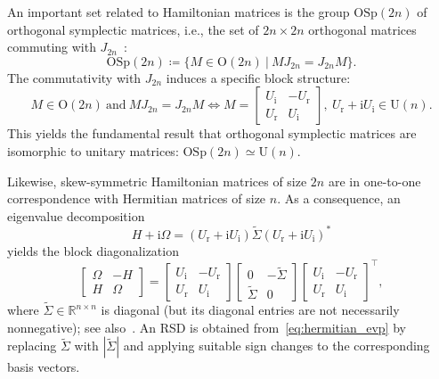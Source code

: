 \documentclass[final,onefignum,onetabnum,dvipsnames]{siamart251216}
\numberwithin{algorithm}{section}
\numberwithin{equation}{section}
\begin{document}
An important set related to Hamiltonian matrices is the group $\mathrm{OSp}(2n)$ of orthogonal symplectic matrices, i.e., the set of $2n\times 2n$ orthogonal matrices commuting with $J_{2n}$~\cite{Dopico09,Fassbender01}:
\begin{equation*}
    \mathrm{OSp}(2n)\coloneq \{M\in \mathrm{O}(2n)\ | \ MJ_{2n} = J_{2n} M\}.
\end{equation*}
The commutativity with $J_{2n}$ induces a specific block structure:
\begin{equation}\label{eq:symplectic_blocks}
    M\in\mathrm{O}(2n)\ \text{and} \ MJ_{2n} = J_{2n} M \iff M = \begin{bmatrix}
            U_\mathrm{i}&-U_\mathrm{r}\\
            U_\mathrm{r}&U_\mathrm{i}
        \end{bmatrix}, \ U_\mathrm{r} + \mathrm{i} U_\mathrm{i} \in \mathrm{U}(n).
\end{equation}
This yields the fundamental result that orthogonal symplectic matrices are isomorphic to unitary matrices: $ \mathrm{OSp}(2n)\simeq \mathrm{U}(n)$.

Likewise, skew-symmetric Hamiltonian matrices of size $2n$ are in one-to-one correspondence with Hermitian matrices of size $n$. As a consequence, an eigenvalue decomposition
\[
 H+\mathrm{i} \Omega = (U_\mathrm{r} + \mathrm{i} U_\mathrm{i})\widetilde{\Sigma} (U_\mathrm{r} + \mathrm{i} U_\mathrm{i})^*
\]
yields the block diagonalization
\begin{equation}\label{eq:hermitian_evp}
        \begin{bmatrix}
            \Omega&-H\\
            H&\Omega
        \end{bmatrix}=\begin{bmatrix}
            U_\mathrm{i}&-U_\mathrm{r}\\
            U_\mathrm{r}&U_\mathrm{i}
        \end{bmatrix} \begin{bmatrix}
            0&-\widetilde{\Sigma}\\
            \widetilde{\Sigma} & 0
        \end{bmatrix} \begin{bmatrix}
            U_\mathrm{i}&-U_\mathrm{r}\\
            U_\mathrm{r}&U_\mathrm{i}
        \end{bmatrix}^\top,
    \end{equation}
    where $\widetilde{\Sigma} \in \mathbb R^{n\times n}$ is diagonal (but its diagonal entries are not necessarily nonnegative); see also~\cite{Fassbender01,Tisseur2001}. An RSD is obtained from~\eqref{eq:hermitian_evp} by replacing 
$\widetilde{\Sigma}$ with $|\widetilde{\Sigma}|$
and applying suitable sign changes to the corresponding basis vectors.
\end{document}
